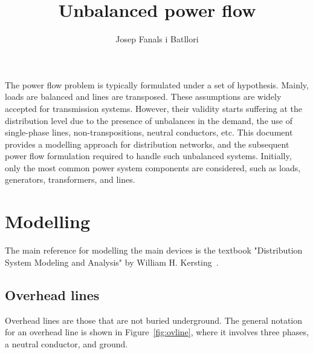 \documentclass[11pt]{article}
\title{\textbf{Unbalanced power flow}}
\author{Josep Fanals i Batllori}
\begin{document}
	
	\maketitle

	The power flow problem is typically formulated under a set of hypothesis. Mainly, loads are balanced and lines are transposed. These assumptions are widely accepted for transmission systems. However, their validity starts suffering at the distribution level due to the presence of unbalances in the demand, the use of single-phase lines, non-transpositions, neutral conductors, etc. This document provides a modelling approach for distribution networks, and the subsequent power flow formulation required to handle such unbalanced systems. Initially, only the most common power system components are considered, such as loads, generators, transformers, and lines. 

	\section{Modelling}
	The main reference for modelling the main devices is the textbook "Distribution System Modeling and Analysis" by William H. Kersting~\cite{kersting2018distribution}.

	\subsection{Overhead lines}
	Overhead lines are those that are not buried underground. The general notation for an overhead line is shown in Figure~\ref{fig:ovline}, where it involves three phases, a neutral conductor, and ground.
\end{document}
